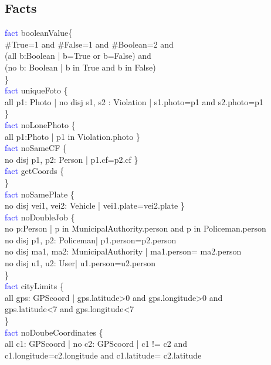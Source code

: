 \subsection{Facts}
\textcolor{blue}{fact}
\textcolor{mycolor}{booleanValue}\{\\
\#True=1 and \#False=1 and \#Boolean=2 and \\
(all b:Boolean | b=True or b=False) and\\
(no b: Boolean | b in True and b in False)\\
\}\\
\textcolor{blue}{fact}
\textcolor{mycolor}{uniqueFoto} \{\\
all p1: Photo | no disj s1, s2 : Violation | s1.photo=p1 and s2.photo=p1\\
\}\\
\textcolor{blue}{fact}
\textcolor{mycolor}{noLonePhoto} \{\\
all p1:Photo | p1 in Violation.photo
\}\\
\textcolor{blue}{fact}
\textcolor{mycolor}{noSameCF} \{\\
no disj p1, p2: Person | p1.cf=p2.cf
\}\\
\textcolor{blue}{fact}
\textcolor{mycolor}{getCoords} \{\\
\}\\
\textcolor{blue}{fact}
\textcolor{mycolor}{noSamePlate} \{\\
no disj vei1, vei2: Vehicle | vei1.plate=vei2.plate
\}\\
\textcolor{blue}{fact}
\textcolor{mycolor}{noDoubleJob} \{\\
no p:Person | p in MunicipalAuthority.person and p in Policeman.person\\
no disj p1, p2: Policeman| p1.person=p2.person\\
no disj ma1, ma2: MunicipalAuthority | ma1.person= ma2.person\\
no disj u1, u2: User| u1.person=u2.person\\
\}\\
\textcolor{blue}{fact}
\textcolor{mycolor}{cityLimits} \{\\
all gps: GPScoord | gps.latitude>0 and gps.longitude>0 and\\
gps.latitude<7 and gps.longitude<7\\
\}\\
\textcolor{blue}{fact}
\textcolor{mycolor}{noDoubeCoordinates} \{\\
all c1: GPScoord | no c2: GPScoord | c1 != c2 and\\ c1.longitude=c2.longitude and c1.latitude= c2.latitude\\
